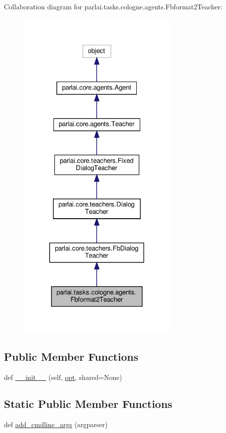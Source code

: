 Collaboration diagram for parlai.\+tasks.\+cologne.\+agents.\+Fbformat2\+Teacher\+:
\nopagebreak
\begin{figure}[H]
\begin{center}
\leavevmode
\includegraphics[width=224pt]{d1/d14/classparlai_1_1tasks_1_1cologne_1_1agents_1_1Fbformat2Teacher__coll__graph}
\end{center}
\end{figure}
\subsection*{Public Member Functions}
\begin{DoxyCompactItemize}
\item 
def \hyperlink{classparlai_1_1tasks_1_1cologne_1_1agents_1_1Fbformat2Teacher_ab0361ba169bc4a455265fd114358f237}{\+\_\+\+\_\+init\+\_\+\+\_\+} (self, \hyperlink{classparlai_1_1core_1_1teachers_1_1FbDialogTeacher_af7a9ec497b9cd0292d7b8fa220da7c28}{opt}, shared=None)
\end{DoxyCompactItemize}
\subsection*{Static Public Member Functions}
\begin{DoxyCompactItemize}
\item 
def \hyperlink{classparlai_1_1tasks_1_1cologne_1_1agents_1_1Fbformat2Teacher_a24dad9673eefe3890899cc9e5834c2c9}{add\+\_\+cmdline\+\_\+args} (argparser)
\end{DoxyCompactItemize}
